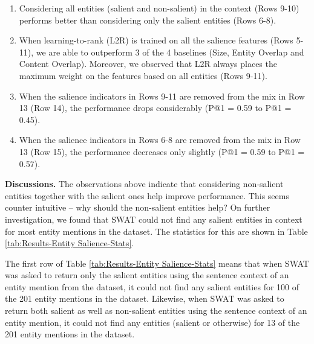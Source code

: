 \documentclass[sigconf,authordraft]{acmart}
\begin{document}
\begin{enumerate}

    \item Considering all entities (salient and non-salient) in the context (Rows 9-10) performs better than considering only the salient entities (Rows 6-8).
    
    \item When learning-to-rank (L2R) is trained on all the salience features (Rows 5-11), we are able to outperform 3 of the 4 baselines (Size, Entity Overlap and Content Overlap). Moreover, we observed that L2R always places the maximum weight on the features based on all entities (Rows 9-11).
    
    \item When the salience indicators in Rows 9-11 are removed from the mix in Row 13 (Row 14), the performance drops considerably (P@1 = 0.59 to P@1 = 0.45). 
    
    \item When the salience indicators in Rows 6-8 are removed from the mix in Row 13 (Row 15), the performance decreases only slightly (P@1 = 0.59 to P@1 = 0.57).
\end{enumerate}


\textbf{Discussions.} The observations above indicate that considering non-salient entities together with the salient ones help improve performance. This seems counter intuitive -- why should the non-salient entities help? On further investigation, we found that SWAT could not find any salient entities in context for most entity mentions in the dataset. The statistics for this are shown in Table \ref{tab:Results-Entity Salience-Stats}. 

The first row of Table \ref{tab:Results-Entity Salience-Stats} means that when SWAT was asked to return only the salient entities using the sentence context of an entity mention from the dataset, it could not find any salient entities for 100 of the 201 entity mentions in the dataset. Likewise, when SWAT was asked to return both salient as well as non-salient entities using the sentence context of an entity mention, it could not find any entities (salient or otherwise) for  13 of the 201 entity mentions in the dataset. 
\end{document}
